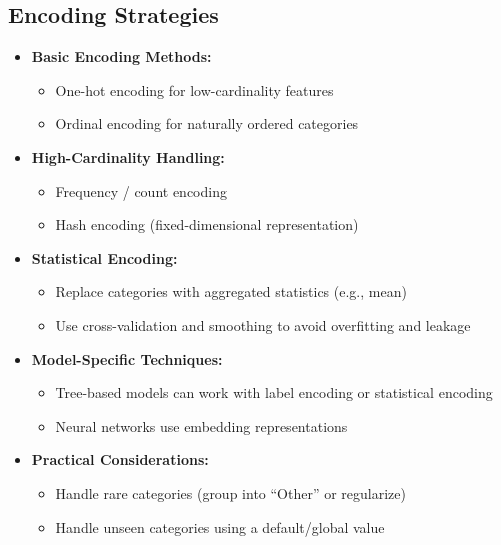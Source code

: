 \documentclass[10pt,a4paper]{article}
\begin{document}
	\subsection{Encoding Strategies}
	\begin{itemize}
		\item \textbf{Basic Encoding Methods:}
		\begin{itemize}
			\item One-hot encoding for low-cardinality features
			\item Ordinal encoding for naturally ordered categories
		\end{itemize}

		\item \textbf{High-Cardinality Handling:}
		\begin{itemize}
			\item Frequency / count encoding
			\item Hash encoding (fixed-dimensional representation)
		\end{itemize}

		\item \textbf{Statistical Encoding:}
		\begin{itemize}
			\item Replace categories with aggregated statistics (e.g., mean)
			\item Use cross-validation and smoothing to avoid overfitting and leakage
		\end{itemize}

		\item \textbf{Model-Specific Techniques:}
		\begin{itemize}
			\item Tree-based models can work with label encoding or statistical encoding
			\item Neural networks use embedding representations
		\end{itemize}

		\item \textbf{Practical Considerations:}
		\begin{itemize}
			\item Handle rare categories (group into ``Other'' or regularize)
			\item Handle unseen categories using a default/global value
		\end{itemize}
	\end{itemize}
\end{document}
